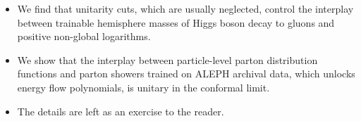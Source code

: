 \begin{itemize}
  \item We find that unitarity cuts, which are usually neglected, control the interplay between trainable hemisphere masses of Higgs boson decay to gluons and positive non-global logarithms.
  \item We show that the interplay between particle-level parton distribution functions and parton showers trained on ALEPH archival data, which unlocks energy flow polynomials, is unitary in the conformal limit.
  \item The details are left as an exercise to the reader.
\end{itemize}

